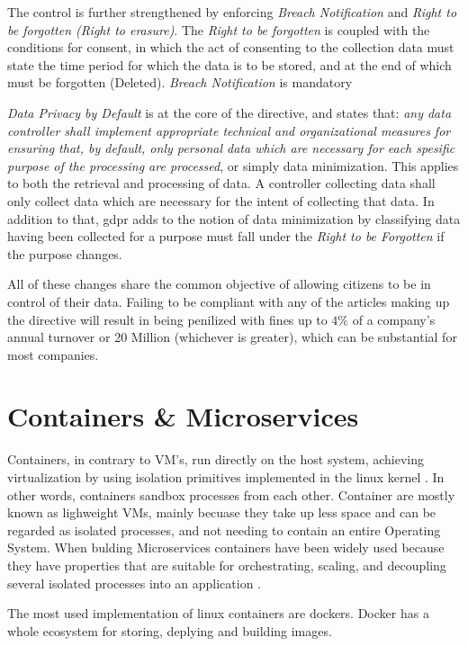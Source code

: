 \documentclass[USenglish]{uit-thesis}
\begin{document}
The control is further strengthened by enforcing \textit{Breach Notification} and
\textit{Right to be forgotten (Right to erasure)}.
The \textit{Right to be forgotten} is coupled with the conditions for consent,
in which the act of consenting to the collection data must state the time period
for which the data is to be stored, and at the end of which must be forgotten (Deleted).
\textit{Breach Notification} is mandatory

\textit{Data Privacy by Default} is at the core of the directive, and states
that: \textit{any data controller shall implement appropriate technical and organizational
measures for ensuring that, by default, only personal data which are necessary for each spesific
purpose of the processing are processed}, or simply data minimization.
This applies to both the retrieval and processing of data.
A controller collecting data shall only collect data which are necessary for the intent
of collecting that data.
In addition to that, \gls{gdpr} adds to the notion of data minimization by classifying
data having been collected for a purpose must fall under the \textit{Right to be Forgotten}
if the purpose changes.

All of these changes share the common objective of allowing citizens to
be in control of their data.
Failing to be compliant with any of the articles making up the
directive will result in being penilized with fines up to $ 4\% $ of a company's annual turnover
or 20 Million (whichever is greater), which can be substantial for most companies.

\chapter{Containers \& Microservices}
Containers, in contrary to VM's, run directly on the host system, achieving virtualization
by using isolation primitives implemented in the linux kernel \cite{Soltesz:2007:COS:1272998.1273025, 7095802}.
In other words, containers sandbox processes from each other.
Container are mostly known as lighweight VMs, mainly becuase they take up less space
and can be regarded as isolated processes, and not needing to contain an entire Operating System.
When bulding Microservices containers have been widely used because they have properties
that are suitable for orchestrating, scaling, and decoupling several isolated processes into an application \cite{micro1}.

The most used implementation of linux containers are dockers.
Docker has a whole ecosystem for storing, deplying and building images.
\end{document}
